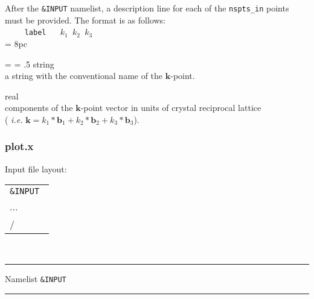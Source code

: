 \noindent After the {\tt \&INPUT} namelist, a description line for each of the
{\tt nspts\_in} points must be provided. The format is as follows:\\

\noindent $\qquad$ \texttt{label} $\quad$ {\tt $k_1$ $k_2$ $k_3$ } \\

\newdimen\descindent \descindent = 8pc
{\noindent \leftskip = \descindent \parskip = .5\baselineskip
{}%
{\sc string} \\ a string with the conventional name of the $\mathbf{k}$-point. \par

\noindent{}%
{\sc real} \\ components of the $\mathbf{k}$-point vector in units of crystal reciprocal
              lattice \\
              ( {\it i.e.} $ \mathbf{k} = k_1 * \mathbf{b}_1 + k_2 * \mathbf{b}_2 +
              k_3 * \mathbf{b}_3 $). \par
}\bigskip

\subsubsection{plot.x}
\noindent Input file layout: \\

%
%
\begin{tabular}{l}
  {\tt \&INPUT } \\
  ... \\
  / \\
\end{tabular}
%
%
\\

\begin{centering}
\rule{2.2in}{0.01in} Namelist {\tt \&INPUT} \rule{2.2in}{0.01in}
\end{centering}\\

